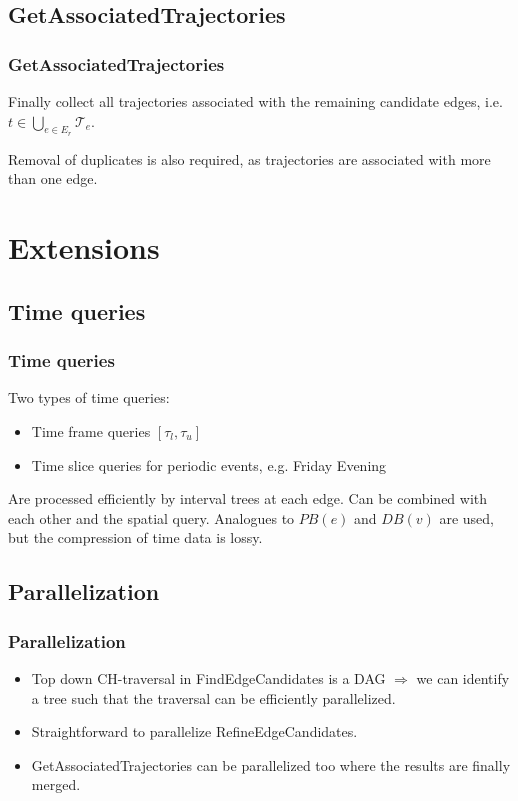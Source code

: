 \documentclass{beamer}
\newcommand{\findEdgeCandidates}{FindEdgeCandidates\xspace}
\newcommand{\refineEdgeCandidates}{RefineEdgeCandidates\xspace}
\newcommand{\getAssociatedTrajectories}{GetAssociatedTrajectories\xspace}
\begin{document}
\subsection{\getAssociatedTrajectories}
\begin{frame}
	\frametitle{\getAssociatedTrajectories}
	Finally collect all trajectories associated with the remaining candidate edges, i.e. $t \in \bigcup_{e \in E_r} \mathcal{T}_e $.\pause

	Removal of duplicates is also required, as trajectories are associated with more than one edge.
\end{frame}

\section{Extensions}

\subsection{Time queries}
\begin{frame}
	\frametitle{Time queries}
	Two types of time queries: \pause
	\begin{itemize}
		\item Time frame queries $[\tau_l, \tau_u]$ \pause
		\item Time slice queries for periodic events, e.g. Friday Evening \pause
	\end{itemize}
	Are processed efficiently by interval trees at each edge. \pause
	Can be combined with each other and the spatial query. \pause
	Analogues to $PB(e)$ and $DB(v)$ are used, but the compression of time data is lossy.
\end{frame}

\subsection{Parallelization}
\begin{frame}
	\frametitle{Parallelization}
	\begin{itemize}
		\item<1-> Top down CH-traversal in \findEdgeCandidates is a DAG \pause $\Rightarrow$ we can identify a tree such that the traversal can be efficiently parallelized.
		\item<2-> Straightforward to parallelize \refineEdgeCandidates.
		\item<3-> \getAssociatedTrajectories can be parallelized too where the results are finally merged.
	\end{itemize}
\end{frame}
\end{document}
